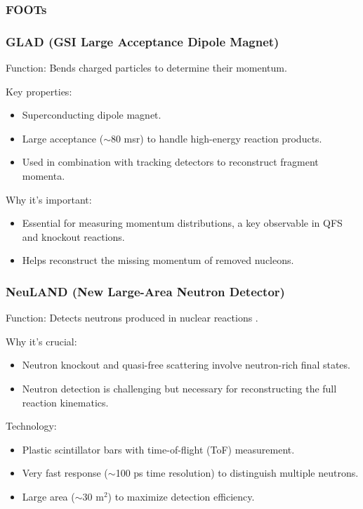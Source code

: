 \subsubsection{FOOTs}

\subsubsection{GLAD (GSI Large Acceptance Dipole Magnet)}

Function: Bends charged particles to determine their momentum.

Key properties:

\begin{itemize}
	\item Superconducting dipole magnet.
	\item Large acceptance ($\sim$80 msr) to handle high-energy reaction products.
	\item Used in combination with tracking detectors to reconstruct fragment momenta.
\end{itemize}

Why it’s important:

\begin{itemize}
	\item Essential for measuring momentum distributions, a key observable in \gls{QFS} and knockout reactions.
	\item Helps reconstruct the missing momentum of removed nucleons.
\end{itemize}


\subsubsection{NeuLAND (New Large-Area Neutron Detector)}

Function: Detects neutrons produced in nuclear reactions \cite{boretzky_neuland_2021}.

Why it's crucial:

\begin{itemize}
	\item Neutron knockout and quasi-free scattering involve neutron-rich final states.
	\item Neutron detection is challenging but necessary for reconstructing the full reaction kinematics.
\end{itemize}


Technology:

\begin{itemize}
	\item Plastic scintillator bars with time-of-flight (ToF) measurement.
	\item Very fast response ($\sim$100 ps time resolution) to distinguish multiple neutrons.
	\item Large area ($\sim$30 m$^2$) to maximize detection efficiency.
\end{itemize}

